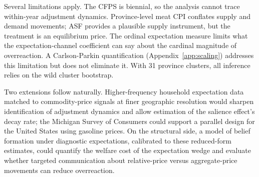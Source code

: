 Several limitations apply.
The CFPS is biennial, so the analysis cannot trace within-year
adjustment dynamics.
Province-level meat CPI conflates supply and demand movements;
ASF provides a plausible supply instrument, but the treatment
is an equilibrium price.
The ordinal expectation measure limits what the
expectation-channel coefficient can say about the cardinal
magnitude of overreaction.
A Carlson-Parkin quantification
(Appendix~\ref{app:scaling}) addresses this limitation
but does not eliminate it.
With 31 province clusters, all inference relies on the wild
cluster bootstrap.

Two extensions follow naturally.
Higher-frequency household expectation data matched to
commodity-price signals at finer geographic resolution would
sharpen identification of adjustment dynamics and allow
estimation of the salience effect's decay rate; the Michigan
Survey of Consumers could support a parallel design for the
United States using gasoline prices.
On the structural side, a model of belief formation under
diagnostic expectations, calibrated to these reduced-form
estimates, could quantify the welfare cost of the expectation
wedge and evaluate whether targeted communication about
relative-price versus aggregate-price movements can reduce
overreaction.
